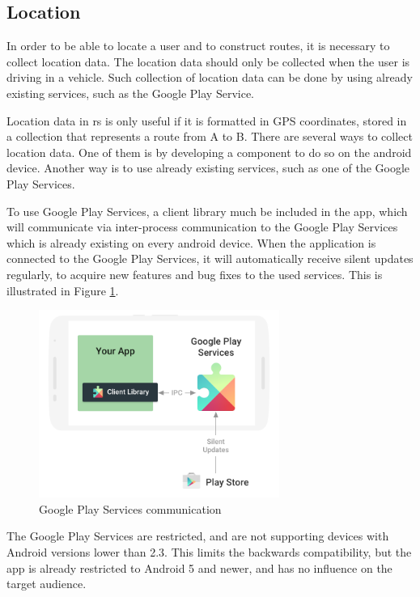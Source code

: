 \subsection{Location}
In order to be able to locate a user and to construct routes, it is necessary to collect location data. 
The location data should only be collected when the user is driving in a vehicle. 
Such collection of location data can be done by using already existing services, such as the Google Play Service.

Location data in \gls{rs} is only useful if it is formatted in GPS coordinates, stored in a collection that represents a route from A to B.
There are several ways to collect location data. 
One of them is by developing a component to do so on the android device. 
Another way is to use already existing services, such as one of the Google Play Services.


To use Google Play Services, a client library much be included in the app, which will communicate via inter-process communication to the Google Play Services which is already existing on every android device. 
When the application is connected to the Google Play Services, it will automatically receive silent updates regularly, to acquire new features and bug fixes to the used services. 
This is illustrated in Figure \ref{fig:gapifigure}\cite{GapiOverview}.

\begin{figure}[h]
	\centering
	\includegraphics[width=0.7\textwidth]{figures/play-services-diagram.png}
	\caption{Google Play Services communication\cite{GapiFigure}}
	\label{fig:gapifigure}
\end{figure}

The Google Play Services are restricted, and are not supporting devices with Android versions lower than 2.3. 
This limits the backwards compatibility, but the app is already restricted to Android 5 and newer, and has no influence on the target audience.

